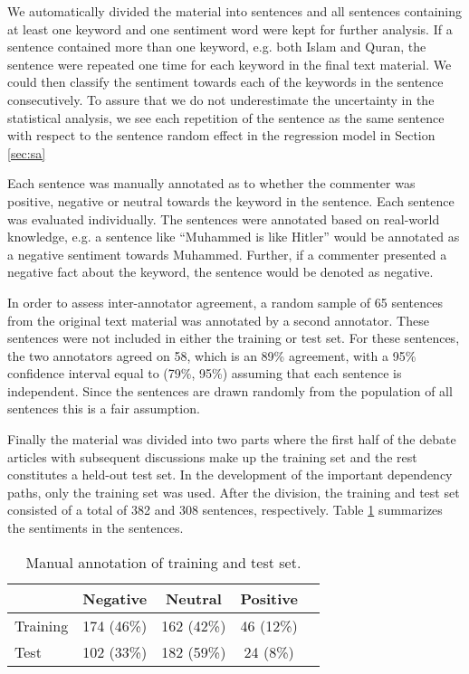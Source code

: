 \documentclass[11pt]{article}
\begin{document}
We automatically divided the material into sentences and all sentences containing at least one keyword and one sentiment word were kept for further analysis. If a sentence contained more than one keyword, e.g. both Islam and Quran, the sentence were repeated one time for each keyword in the final text material. We could then classify the sentiment towards each of the keywords in the sentence consecutively. To assure that we do not underestimate the uncertainty in the statistical analysis, we see each repetition of the sentence as the same sentence with respect to the sentence random effect in the regression model in Section \ref{sec:sa}

Each sentence was manually annotated as to whether the commenter was positive, negative or neutral towards the keyword in the sentence. Each sentence was evaluated individually. The sentences were annotated based on real-world knowledge, e.g. a sentence like ``Muhammed is like Hitler'' would be annotated as a negative sentiment towards Muhammed. Further, if a commenter presented a negative fact about the keyword, the sentence would be denoted as negative.

In order to assess inter-annotator agreement, a random sample of 65 sentences from the original text material was annotated by a second annotator. These sentences were not included in either the training or test set. For these sentences, the two annotators agreed on 58, which is an 89\% agreement, with a 95\% confidence interval equal to (79\%, 95\%) assuming that each sentence is independent. Since the sentences are drawn randomly from the population of all sentences this is a fair assumption.

Finally the material was divided into two parts where the first half of the debate articles with subsequent discussions make up the training set and the rest constitutes a held-out test set. In the development of the important dependency paths, only the training set was used. After the division, the training and test set consisted of a total of 382 and 308 sentences, respectively. Table \ref{tab:1} summarizes the sentiments in the sentences.
\begin{table}
  \centering
  \begin{tabular}{lcccc}
             & Negative & Neutral & Positive \\\hline
    Training & 174 (46\%) & 162 (42\%) & 46 (12\%)\\
    Test     & 102 (33\%)& 182 (59\%) & 24 (8\%)
  \end{tabular}
  \label{tab:1}
  \caption{Manual annotation of training and test set.}
\end{table}
\end{document}
